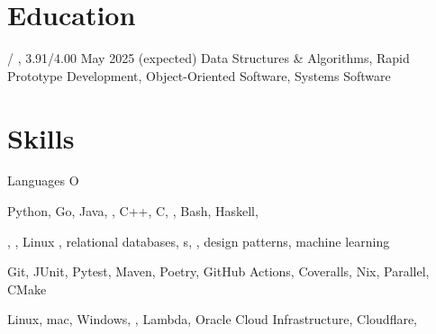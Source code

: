 \section{Education}
\begin{outline}
     / ,  3.91/4.00
    \hfill May 2025 (expected)
        \1 Data Structures \& Algorithms, Rapid Prototype Development, Object-Oriented Software, Systems Software
\end{outline}

\section{Skills}
\begin{labeling}{Languages O}
    \item [Languages] Python, Go, Java, , C++, C, , Bash, Haskell, \textsmaller{\LaTeX}
    \item [Concepts] , , Linux , relational databases, s, , design patterns, machine learning
    \item [Tools] Git, JUnit, Pytest, Maven, Poetry, GitHub Actions, Coveralls, Nix,  Parallel, CMake
    \item [Platforms] Linux, mac, Windows, ,  Lambda, Oracle Cloud Infrastructure, Cloudflare, 
\end{labeling}

